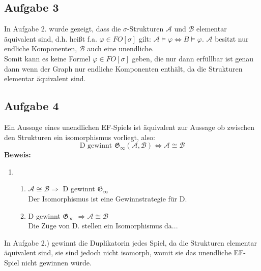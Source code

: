 \documentclass[a4paper,10pt]{article}
\begin{document}
\subsection*{Aufgabe 3}
In Aufgabe 2. wurde gezeigt, dass die $\sigma$-Strukturen $\mathcal{A}$ und $\mathcal{B}$ elementar äquivalent sind, d.h. heißt f.a. $\varphi \in FO[\sigma]$ gilt: $\mathcal{A} \vDash \varphi \Leftrightarrow B \vDash \varphi$. $\mathcal{A}$ besitzt nur endliche Komponenten, $\mathcal{B}$ auch eine unendliche. \\Somit kann es keine Formel $\varphi \in FO[\sigma]$ geben, die nur dann erfüllbar ist genau dann wenn der Graph nur endliche Komponenten enthält, da die Strukturen elementar äquivalent sind.


\subsection*{Aufgabe 4}

Ein Aussage eines unendlichen EF-Spiels ist äquivalent zur Aussage ob zwischen den Strukturen ein isomorphismus vorliegt, also:
\[\text{D gewinnt }\mathfrak{G}_{\infty}(\mathcal{A}, \mathcal{B}) \Leftrightarrow  \mathcal{A} \cong \mathcal{B}\]
\textbf{Beweis:}
\begin{enumerate}
	\item 
	\begin{enumerate}
		\item 	$\mathcal{A} \cong \mathcal{B} \Rightarrow $ D gewinnt $\mathfrak{G}_{\infty}$ \\
			Der Isomorphismus ist eine Gewinnstrategie für D.
		\item 	D gewinnt $\mathfrak{G}_{\infty}$ $\Rightarrow \mathcal{A} \cong \mathcal{B} $ \\
			Die Züge von D. stellen ein Isomorphismus da...
	\end{enumerate}
\end{enumerate}
In Aufgabe 2.) gewinnt die Duplikatorin jedes Spiel, da die Strukturen elementar äquivalent sind, sie sind jedoch nicht isomorph, womit sie das unendliche EF-Spiel nicht gewinnen würde.
\end{document}
